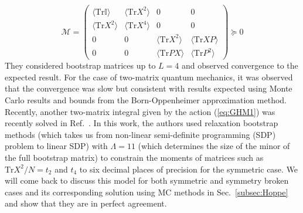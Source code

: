 \documentclass[letter,11pt]{article}
\begin{document}
\begin{equation}
	\mathcal{M} = 
	\begin{pmatrix}
		\langle \mbox{Tr}\mathbb{I} \rangle & \langle \mbox{Tr} X^2 \rangle & 0 & 0 \\
		\langle \mbox{Tr} X^2 \rangle & \langle \mbox{Tr} X^4 \rangle  & 0 & 0 \\ 
		0 & 0 & \langle \mbox{Tr} X^2 \rangle & \langle \mbox{Tr} XP \rangle \\
		0 & 0  & \langle \mbox{Tr} PX \rangle & \langle \mbox{Tr} P^2 \rangle
	\end{pmatrix}  \succeq 0
\end{equation}
They considered bootstrap matrices up to $L=4$ and observed
convergence to the expected result. 
For the case of two-matrix quantum mechanics, it was observed that the convergence
was slow but consistent with results expected using Monte Carlo results and bounds from the Born-Oppenheimer approximation method. Recently, another two-matrix integral given by the action (\ref{eq:GHM1}) was recently solved in Ref.~\cite{Kazakov:2021lel}. 
In this work, the authors used relaxation bootstrap methods (which takes us 
from non-linear semi-definite programming (SDP) problem to linear SDP) with
$\Lambda=11$ (which determines the size of the minor of the full bootstrap matrix) 
to constrain the moments of matrices such as $\mathrm{Tr}X^2/N = t_{2}$ and $t_{4}$ 
to six decimal places of precision for the symmetric case. We will come back to 
discuss this model for both symmetric and symmetry broken cases 
and its corresponding solution using MC methods in Sec.~\ref{subsec:Hoppe} 
and show that they are in perfect agreement.  
\end{document}

